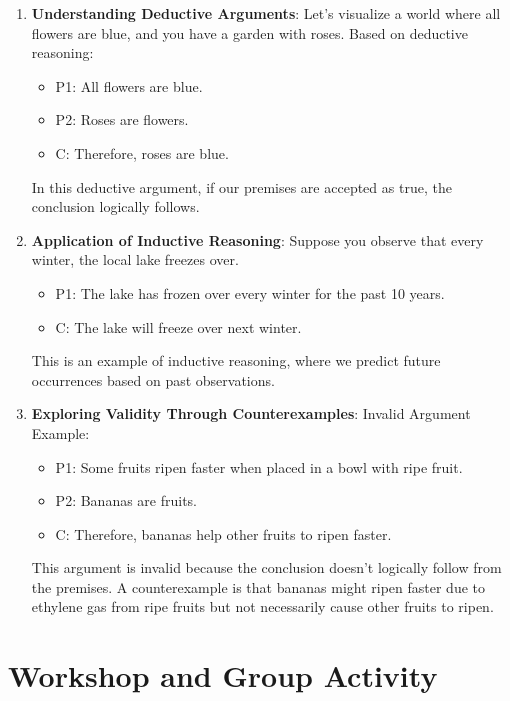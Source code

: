 \documentclass{article}
\begin{document}
\begin{enumerate}
    \item \textbf{Understanding Deductive Arguments}:
          Let’s visualize a world where all flowers are blue, and you have a garden with roses. Based on deductive reasoning:
          \begin{itemize}
              \item P1: All flowers are blue.
              \item P2: Roses are flowers.
              \item C: Therefore, roses are blue.
          \end{itemize}
          In this deductive argument, if our premises are accepted as true, the conclusion logically follows.
    \item \textbf{Application of Inductive Reasoning}:
          Suppose you observe that every winter, the local lake freezes over.
          \begin{itemize}
              \item P1: The lake has frozen over every winter for the past 10 years.
              \item C: The lake will freeze over next winter.
          \end{itemize}
          This is an example of inductive reasoning, where we predict future occurrences based on past observations.
    \item \textbf{Exploring Validity Through Counterexamples}:
          Invalid Argument Example:
          \begin{itemize}
              \item P1: Some fruits ripen faster when placed in a bowl with ripe fruit.
              \item P2: Bananas are fruits.
              \item C: Therefore, bananas help other fruits to ripen faster.
          \end{itemize}
          This argument is invalid because the conclusion doesn't logically follow from the premises. A counterexample is that bananas might ripen faster due to ethylene gas from ripe fruits but not necessarily cause other fruits to ripen.
\end{enumerate}

\section{Workshop and Group Activity}
\end{document}
